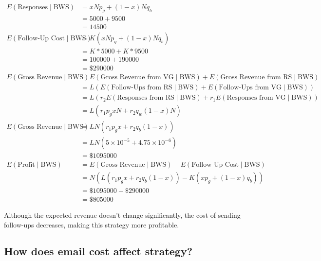 \documentclass{article}
\begin{document}
\begin{align}
E\left( \text{Responses} \mid \text{BWS} \right)
	& = x N p_g + (1 - x) N q_b \nonumber \\
	& = 5000 + 9500 \nonumber \\
	& = 14500 \nonumber \\
E\left( \text{Follow-Up Cost} \mid \text{BWS} \right) 
	& = K \left(x N p_g + (1 - x) N q_b \right) \nonumber \\
	& = K * 5000 + K * 9500 \nonumber \\
	& = 100000 + 190000 \nonumber\\
	& = \$ 290000 \nonumber\\ 
E\left( \text{Gross Revenue} \mid \text{BWS} \right)
	& = E\left( \text{Gross Revenue from VG} \mid \text{BWS} \right)
	+ E\left( \text{Gross Revenue from RS} \mid \text{BWS} \right) \nonumber \\
	& = L \left( 
		E\left( \text{Follow-Ups from RS} \mid \text{BWS} \right)
		+ E\left( \text{Follow-Ups from VG} \mid \text{BWS} \right) \right) \nonumber \\
	& = L \left( 
		r_2 E\left( \text{Responses from RS} \mid \text{BWS} \right)
		+ r_1 E\left( \text{Responses from VG} \mid \text{BWS} \right) \right) \nonumber \\
	& = L \left( 
		r_1 p_g x N
		+ r_2 q_w (1-x) N  \right) \nonumber \\
E\left( \text{Gross Revenue} \mid \text{BWS} \right)
	& = L N \left( r_1 p_g x + r_2 q_b (1-x) \right) \nonumber \\
	& = L N \left( 5 \times 10^{-5} + 4.75 \times 10^{-6} \right) \nonumber \\
	& = \$ 1095000 \nonumber \\
E\left( \text{Profit} \mid \text{BWS} \right)
	& = E\left( \text{Gross Revenue} \mid \text{BWS} \right)
	- E\left( \text{Follow-Up Cost} \mid \text{BWS} \right) \nonumber \\
	& = N \left( L \left( 
		r_1 p_g x
		+ r_2 q_b (1-x)  \right) 
	- K \left(x p_g + (1 - x) q_b \right) \right) \nonumber\\
	& = \$ 1095000 - \$ 290000 \nonumber \\
	& = \$ 805000 \nonumber
\end{align}

Although the expected revenue doesn't change significantly,
	the cost of sending follow-ups decreases, making this strategy
	more profitable.

\subsection{How does email cost affect strategy?}
\end{document}
